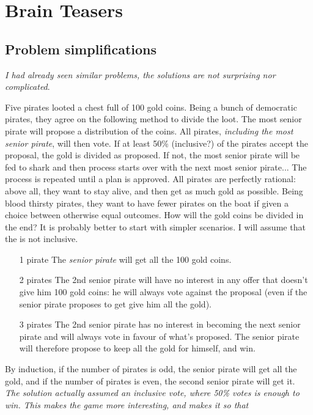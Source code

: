 \section{Brain Teasers}

\subsection{Problem simplifications}

\emph{I had already seen similar problems, the solutions are not surprising nor complicated}.

\begin{qanda}
    \Q
    Five pirates looted a chest full of 100 gold coins. 
    Being a bunch of democratic pirates, they agree on the following method to divide the loot.
    The most senior pirate will propose a distribution of the coins. All pirates, \emph{including the most senior pirate}, will then vote. If at least 50\% (inclusive?) of the pirates accept the proposal, the gold is divided as proposed. If not, the most senior pirate will be fed to shark and then process starts over with the next most senior pirate...
    The process is repeated until a plan is approved. All pirates are perfectly rational: above all, they want to stay alive, and then get as much gold as possible. Being blood thirsty pirates, they want to have fewer pirates on the boat if given a choice between otherwise equal outcomes. How will the gold coins be divided in the end?
    \A It is probably better to start with simpler scenarios. I will assume that the  is not inclusive.
    \begin{itemize}
        \item[1 pirate] The \emph{senior pirate} will get all the 100 gold coins.
        \item[2 pirates] The 2nd senior pirate will have no interest in any offer that doesn't give him 100 gold coins: he will always vote against the proposal (even if the senior pirate proposes to get give him all the gold). 
        \item[3 pirates] The 2nd senior pirate has no interest in becoming the next senior pirate and will always vote in favour of what's proposed. The senior pirate will therefore propose to keep all the gold for himself, and win.
    \end{itemize}
    By induction, if the number of pirates is odd, the senior pirate will get all the gold, and if the number of pirates is even, the second senior pirate will get it. \\
    \emph{The solution actually assumed an inclusive vote, where 50\% votes is enough to win. This makes the game more interesting, and makes it so that }
\end{qanda}

